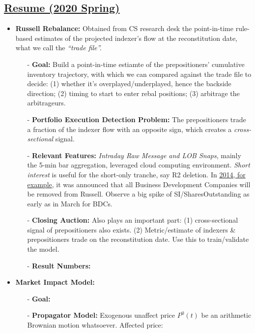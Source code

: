\documentclass[9pt, landscape]{article}
\begin{document}
\begin{multicols*}{3}
\section{\href{run:./Ze_Yang_Resume.pdf}{Resume (2020 Spring)}}
\begin{itemize}
	\item \textbf{Russell Rebalance:} Obtained from CS research desk the point-in-time rule-based estimates of the projected indexer's flow at the reconstitution date, what we call the \textit{``trade file''.}
	\begin{itemize}[leftmargin=10pt,noitemsep,topsep=0pt,partopsep=0pt]
		\item[-] \textbf{Goal:} Build a point-in-time estiamte of the prepositioners' cumulative inventory trajectory, with which we can compared against the trade file to decide: (1) whether it's overplayed/underplayed, hence the backside direction; (2) timing to start to enter rebal positions; (3) arbitrage the arbitrageurs.
		\item[-] \textbf{Portfolio Execution Detection Problem:} The prepositioners trade a fraction of the indexer flow with an opposite sign, which creates a \textit{cross-sectional} signal.
		\item[-] \textbf{Relevant Features:} \textit{Intraday Raw Message and LOB Snaps}, mainly the 5-min bar aggregation, leveraged cloud computing environment. \textit{Short interest} is useful for the short-only tranche, say R2 deletion. In \href{https://seekingalpha.com/article/2277223-quantifying-bdcs-removal-from-the-russell-indices}{2014, for example}, it was announced that all Business Development Companies will be removed from Russell. Observe a big spike of SI/SharesOutstanding as early as in March for BDCs.
		\item[-] \textbf{Closing Auction:} Also plays an important part: (1) cross-sectional signal of prepositioners also exists. (2) Metric/estimate of indexers \& prepositioners trade on the reconstitution date. Use this to train/validate the model.
		\item[-] \textbf{Result Numbers:}
	\end{itemize}
	\item \textbf{Market Impact Model:}
	\begin{itemize}[leftmargin=10pt,noitemsep,topsep=0pt,partopsep=0pt]
		\item[-] \textbf{Goal:} 
		\item[-] \textbf{Propagator Model:} Exogenous unaffect price $P^0(t)$ be an arithmetic Brownian motion whatsoever. Affected price:

\end{itemize}
\end{itemize}
\end{multicols*}
\end{document}
